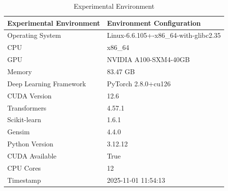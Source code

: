 \begin{table}
\caption{Experimental Environment}
\label{tab:env}
\begin{tabular}{ll}
\toprule
Experimental Environment & Environment Configuration \\
\midrule
Operating System & Linux-6.6.105+-x86_64-with-glibc2.35 \\
CPU & x86_64 \\
GPU & NVIDIA A100-SXM4-40GB \\
Memory & 83.47 GB \\
Deep Learning Framework & PyTorch 2.8.0+cu126 \\
CUDA Version & 12.6 \\
Transformers & 4.57.1 \\
Scikit-learn & 1.6.1 \\
Gensim & 4.4.0 \\
Python Version & 3.12.12 \\
CUDA Available & True \\
CPU Cores & 12 \\
Timestamp & 2025-11-01 11:54:13 \\
\bottomrule
\end{tabular}
\end{table}
